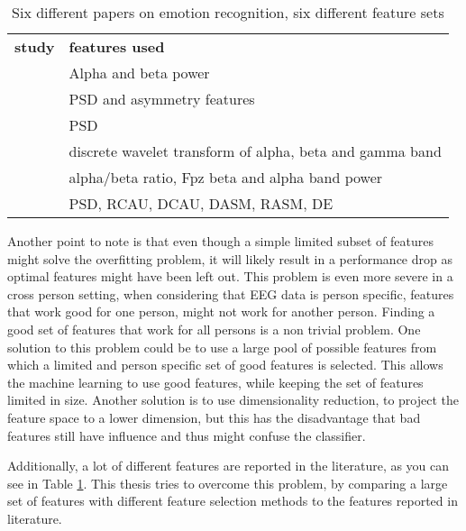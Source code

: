 \begin{table}[]
\centering
\caption{Six different papers on emotion recognition, six different feature sets}
\label{diffFeat}
\begin{tabular}{ll}
\textbf{study} & \textbf{features used}                         \\
\citep{ref4}     & Alpha and beta power                           \\
\citep{ref7}     & PSD and asymmetry features                     \\
\citep{ref8}     & PSD                                            \\
\citep{ref6}     & discrete wavelet transform of alpha, beta and gamma band \\
\citep{ExtendedPaper}	&	alpha/beta ratio, Fpz beta and alpha band power \\
\citep{killyPaper} & PSD, RCAU, DCAU, DASM, RASM, DE \\
\end{tabular}
\end{table}

Another point to note is that even though a simple limited subset of features might solve the overfitting problem, it will likely result in a performance drop as optimal features might have been left out. This problem is even more severe in a cross person setting, when considering that EEG data is person specific\citep{DEAP}, features that work good for one person, might not work for another person. Finding a good set of features that work for all persons is a non trivial problem. One solution to this problem could be to use a large pool of possible features from which a limited and person specific set of good features is selected. This allows the machine learning to use good features, while keeping the set of features limited in size. Another solution is to use dimensionality reduction, to project the feature space to a lower dimension, but this has the disadvantage that bad features still have influence and thus might confuse the classifier. 

\npar

Additionally, a lot of different features are reported in the literature, as you can see in Table \ref{diffFeat}. This thesis tries to overcome this problem, by comparing a large set of features with different feature selection methods to the features reported in literature.




